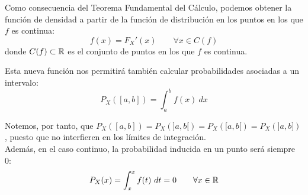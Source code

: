 Como consecuencia del Teorema Fundamental del Cálculo, podemos obtener la función de densidad a partir de la función de distribución en los puntos en los que $f$ es continua:
$$f(x) = F_X'(x) \qquad \forall x \in C(f)$$
donde $C(f)\subset \mathbb{R}$ es el conjunto de puntos en los que $f$ es continua.

Esta nueva función nos permitirá también calcular probabilidades asociadas a un intervalo:
$$P_X([a,b]) = \int_a^b f(x)~dx$$

Notemos, por tanto, que $P_X([a,b]) = P_X(]a,b[) = P_X([a,b[) = P_X(]a,b])$, puesto que no interfieren en los límites de integración.\\

Además, en el caso continuo, la probabilidad inducida en un punto será siempre~$0$:
$$P_X(x) = \int_x^x f(t)~dt = 0 \qquad \forall x \in \mathbb R$$

